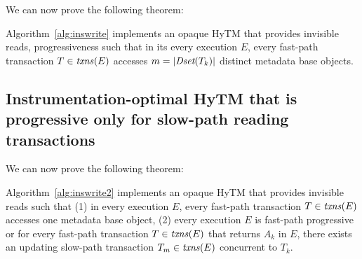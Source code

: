We can now prove the following theorem:
%
\begin{theorem}
\label{th:inswrite}
Algorithm~\ref{alg:inswrite} implements an opaque HyTM that provides invisible reads, progressiveness
such that in its every execution $E$, every fast-path transaction $T\in \ms{txns}(E)$
accesses $m=|\textit{Dset}(T_k)|$ distinct metadata base objects.
\end{theorem}
%
\begin{proofsketch}
%

\end{proofsketch}
%

%
\subsection{Instrumentation-optimal HyTM that is progressive only for slow-path reading transactions}
\label{sec:hytm2}
%
We can now prove the following theorem:
%
\begin{theorem}
\label{th:inswrite2}
Algorithm~\ref{alg:inswrite2} implements an opaque HyTM that provides invisible reads
such that (1) in every execution $E$,
every fast-path transaction $T\in \ms{txns}(E)$
accesses one metadata base object,
(2) every execution $E$ is fast-path progressive or for
every fast-path transaction $T\in \ms{txns}(E)$
that returns $A_k$ in $E$, there exists an updating slow-path transaction $T_m \in \ms{txns}(E)$
concurrent to $T_k$.
\end{theorem}
%
%

